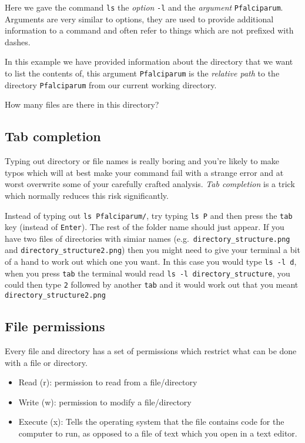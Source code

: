 \documentclass[11pt]{article}
\providecommand{\tightlist}{%
      \setlength{\itemsep}{0pt}\setlength{\parskip}{0pt}}
\begin{document}
    Here we gave the command \texttt{ls} the \textit{option} \texttt{-l} and
the \textit{argument} \texttt{Pfalciparum}. Arguments are very similar to
options, they are used to provide additional information to a command
and often refer to things which are not prefixed with dashes.

In this example we have provided information about the directory that we
want to list the contents of, this argument \texttt{Pfalciparum} is the
\textit{relative path} to the directory \texttt{Pfalciparum} from our
current working directory.

How many files are there in this directory?

    \hypertarget{tab-completion}{%
\subsection{Tab completion}\label{tab-completion}}

Typing out directory or file names is really boring and you're likely to
make typos which will at best make your command fail with a strange
error and at worst overwrite some of your carefully crafted analysis.
\textit{Tab completion} is a trick which normally reduces this risk
significantly.

Instead of typing out \texttt{ls\ Pfalciparum/}, try typing
\texttt{ls\ P} and then press the \texttt{tab} key (instead of
\texttt{Enter}). The rest of the folder name should just appear. If you
have two files of directories with simiar names
(e.g.~\texttt{directory\_structure.png} and
\texttt{directory\_structure2.png}) then you might need to give your
terminal a bit of a hand to work out which one you want. In this case
you would type \texttt{ls\ -l\ d}, when you press \texttt{tab} the
terminal would read \texttt{ls\ -l\ directory\_structure}, you could
then type \texttt{2} followed by another \texttt{tab} and it would work
out that you meant \texttt{directory\_structure2.png}

    \hypertarget{file-permissions}{%
\subsection{File permissions}\label{file-permissions}}

Every file and directory has a set of permissions which restrict what
can be done with a file or directory.

\begin{itemize}
\tightlist
\item
  Read (r): permission to read from a file/directory
\item
  Write (w): permission to modify a file/directory
\item
  Execute (x): Tells the operating system that the file contains code
  for the computer to run, as opposed to a file of text which you open
  in a text editor.
\end{itemize}
\end{document}

